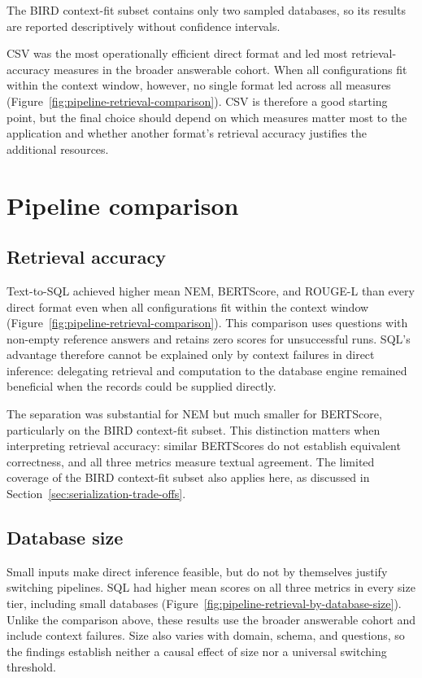The BIRD context-fit subset contains only two sampled databases, so its results are reported descriptively
without confidence intervals.

CSV was the most operationally efficient direct format and led most retrieval-accuracy measures in the broader
answerable cohort. When all configurations fit within the context window, however, no single format led across
all measures (Figure~\ref{fig:pipeline-retrieval-comparison}). CSV is therefore a good starting point, but the
final choice should depend on which measures matter most to the application and whether another format’s retrieval
accuracy justifies the additional resources.

\section{Pipeline comparison} \label{sec:pipeline-comparison-discussion}

\subsection{Retrieval accuracy}

Text-to-SQL achieved higher mean NEM, BERTScore, and ROUGE-L than every direct format even when all
configurations fit within the context window (Figure~\ref{fig:pipeline-retrieval-comparison}). This comparison
uses questions with non-empty reference answers and retains zero scores for unsuccessful runs. SQL's
advantage therefore cannot be explained only by context failures in direct inference: delegating retrieval
and computation to the database engine remained beneficial when the records could be supplied directly.

The separation was substantial for NEM but much smaller for BERTScore, particularly on the BIRD context-fit
subset. This distinction matters when interpreting retrieval accuracy: similar BERTScores do not establish equivalent
correctness, and all three metrics measure textual agreement. The limited coverage of the BIRD context-fit
subset also applies here, as discussed in Section~\ref{sec:serialization-trade-offs}.

\subsection{Database size} \label{sec:pipeline-size-interpretation}

Small inputs make direct inference feasible, but do not by themselves justify switching pipelines. SQL had
higher mean scores on all three metrics in every size tier, including small databases
(Figure~\ref{fig:pipeline-retrieval-by-database-size}). Unlike the comparison above, these results use the
broader answerable cohort and include context failures. Size also varies with domain, schema, and questions,
so the findings establish neither a causal effect of size nor a universal switching threshold.

